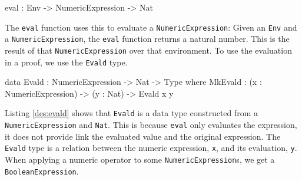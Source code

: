         \begin{code}[caption={The type of the \texttt{eval} function}]
            eval : Env -> NumericExpression -> Nat
        \end{code}
        The \texttt{eval} function uses this to evaluate a \texttt{NumericExpression}: Given an \texttt{Env} and a \texttt{NumericExpression}, the \texttt{eval} function returns a natural number. This is the result of that \texttt{NumericExpression} over that environment. To use the evaluation in a proof, we use the \texttt{Evald} type.
        \begin{code}[caption={\texttt{Evald} as defined in the \Idris model},label={des:evald}]
    data Evald : NumericExpression -> Nat -> Type where
        MkEvald : (x : NumericExpression) -> (y : Nat) -> Evald x y
        \end{code}
        Listing \ref{des:evald} shows that \texttt{Evald} is a data type constructed from a \texttt{NumericExpression} and \texttt{Nat}. This  is because \texttt{eval} only evaluates the expression, it does not provide link the evaluated value and the original expression. The \texttt{Evald} type is a relation between the numeric expression, \texttt{x}, and its evaluation, \texttt{y}.
        \\
        
        When applying a numeric operator to some \texttt{NumericExpression}s, we get a \texttt{BooleanExpression}.
    

